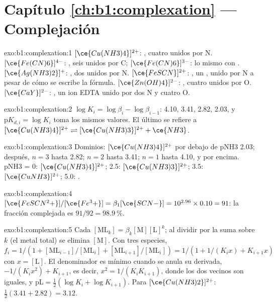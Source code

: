 \section*{Capítulo \ref{ch:b1:complexation} --- Complejación}

\begin{solution}{exo:b1:complexation:1}
$[\ce{Cu(NH3)4}]^{2+}$: , cuatro  unidos por N.
$[\ce{Fe(CN)6}]^{4-}$: , seis  unidos por C;
$[\ce{Fe(CN)6}]^{3-}$: lo mismo con . $[\ce{Ag(NH3)2}]^{+}$:
, dos  unidos por N. $[\ce{FeSCN}]^{2+}$: , un
, unido por N a pesar de cómo se escribe la fórmula.
$[\ce{Zn(OH)4}]^{2-}$: , cuatro  unidos por O.
$[\ce{CaY}]^{2-}$: , un ion EDTA unido por dos N y cuatro O.
\end{solution}

\begin{solution}{exo:b1:complexation:2}
$\log K_i = \log\beta_i - \log\beta_{i-1}$: 4.10, 3.41, 2.82, 2.03, y
$\mathrm{p}K_{d,i} = \log K_i$ toma los mismos valores. El último se
refiere a
$[\ce{Cu(NH3)4}]^{2+} \rightleftharpoons [\ce{Cu(NH3)3}]^{2+} + \ce{NH3}$.
\end{solution}

\begin{solution}{exo:b1:complexation:3}
Dominios: $[\ce{Cu(NH3)4}]^{2+}$ por debajo de pNH3 2.03; después, $n = 3$
hasta 2.82; $n = 2$ hasta 3.41; $n = 1$ hasta 4.10, y  por
encima. pNH3 = 0:
$[\ce{Cu(NH3)4}]^{2+}$; 2.5: $[\ce{Cu(NH3)3}]^{2+}$; 3.5:
$[\ce{CuNH3}]^{2+}$; 5.0: .
\end{solution}

\begin{solution}{exo:b1:complexation:4}
$[\ce{FeSCN^2+}]/[\ce{Fe^3+}] = \beta_1[\ce{SCN-}] = 10^{2.96} \times 0.10 =
91$: la fracción complejada es $91/92 = \qty{98.9}{\percent}$.
\end{solution}

\begin{solution}{exo:b1:complexation:5}
Cada $[\mathrm{ML}_k] = \beta_k[\mathrm{M}][\mathrm{L}]^k$; al dividir
por la suma sobre $k$ (el metal total) se elimina $[\mathrm{M}]$. Con tres
especies, $f_i = 1/(1 + [\mathrm{ML}_{i-1}]/[\mathrm{ML}_i] +
[\mathrm{ML}_{i+1}]/[\mathrm{ML}_i]) = 1/(1 + 1/(K_i x) + K_{i+1}x)$ con
$x = [\mathrm{L}]$. El denominador es mínimo cuando se anula su derivada,
$-1/(K_i x^2) + K_{i+1}$, es decir, $x^2 = 1/(K_iK_{i+1})$, donde los dos
vecinos son iguales, y $\mathrm{pL} = \frac12(\log K_i + \log K_{i+1})$.
Para $[\ce{Cu(NH3)2}]^{2+}$: $\frac12(3.41 + 2.82) = 3.12$.
\end{solution}

